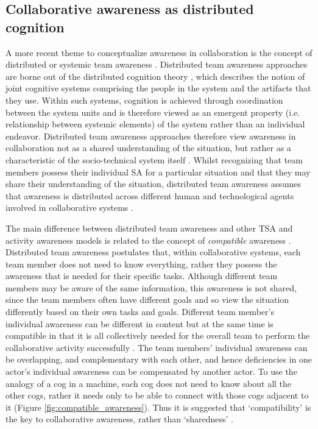 \subsection{Collaborative awareness as distributed cognition} %
\label{sub:distributed_team_awareness}
A more recent theme to conceptualize awareness in collaboration is the concept of distributed or systemic team awareness \cite{Stanton2009,artman1998situation}. Distributed team awareness approaches are borne out of the distributed cognition theory \cite{hutchins1995cognition}, which describes the notion of joint cognitive systems comprising the people in the system and the artifacts that they use. Within such systems, cognition is achieved through coordination between the system units \cite{artman1998situation} and is therefore viewed as an emergent property (i.e. relationship between systemic elements) of the system rather than an individual endeavor. Distributed team awareness approaches therefore view awareness in collaboration not as a shared understanding of the situation, but rather as a characteristic of the socio-technical system itself \cite{artman1998situation}. Whilst recognizing that team members possess their individual SA for a particular situation and that they may share their understanding of the situation, distributed team awareness assumes that awareness is distributed across different human and technological agents involved in collaborative systems \cite{Stanton2009}.

The main difference between distributed team awareness and other TSA and activity awareness models is related to the concept of \emph{compatible} awareness \cite{Stanton2009}. Distributed team awareness postulates that, within collaborative systems, each team member does not need to know everything, rather they possess the awareness that is needed for their specific tasks. Although different team members may be aware of the same information, this awareness is not shared, since the team members often have different goals and so view the situation differently based on their own tasks and goals. Different team member's individual awareness can be different in content but at the same time is compatible in that it is all collectively needed for the overall team to perform the collaborative activity successfully \cite{Salmon2010}. The team members' individual awareness can be overlapping, and complementary with each other, and hence deficiencies in one actor's individual awareness can be compensated by another actor. To use the analogy of a cog in a machine, each cog does not need to know about all the other cogs, rather it needs only to be able to connect with those cogs adjacent to it (Figure \ref{fig:compatible_awareness}). Thus it is suggested that `compatibility' is the key to collaborative awareness, rather than `sharedness' \cite{Salmon2008a}.

